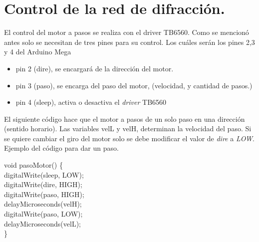 \section{Control de la red de difracción.}
El control del motor a pasos se realiza con el driver TB6560. Como se mencionó antes solo se necesitan de tres pines para su control. Los cuáles serán los pines 2,3 y 4 del Arduino Mega
\begin{itemize}
	\item pin 2 (dire), se encargará de la dirección del motor.
	\item pin 3 (paso), se encarga del paso del motor, (velocidad, y cantidad de pasos.)
	\item pin 4 (sleep), activa o desactiva el \textit{driver} TB6560
\end{itemize}
El siguiente código hace que el motor a pasos de un solo paso en una dirección (sentido horario). Las variables velL y velH, determinan la velocidad del paso. Si se quiere cambiar el giro del motor solo se debe modificar el valor de \textit{dire} a \textit{LOW}. Ejemplo del código para dar un paso.
\begin{center}
	void pasoMotor() \{ \\
	digitalWrite(sleep, LOW);\\ 
	digitalWrite(dire, HIGH);\\
	digitalWrite(paso, HIGH);\\
	delayMicroseconds(velH);\\
	digitalWrite(paso, LOW);\\
	delayMicroseconds(velL);\\
	\}
\end{center}


